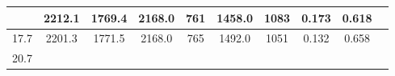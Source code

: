\documentclass[a4paper,12pt]{article}
\begin{document}
\begin{longtable}{
     |
%    
    c|
%    
    c|
%    
    c|
%    
    c|
%    
    c|
%    
    c|
%    
    c|
%    
    c|
%    
    c|
%    
    c|
%    
    }
%        
        & 2212.1
%        

%        

%        
        & 1769.4
%        

%        

%        
        & 2168.0
%        

%        

%        
        & 761
%        

%        

%        
        & 1458.0
%        

%        

%        
        & 1083
%        

%        

%        
        & 0.173
%        

%        

%        
        & 0.618
%        

%        
        \\
        \hline

        

%        

%        
        17.7
%        

%        

%        
        & 2201.3
%        

%        

%        
        & 1771.5
%        

%        

%        
        & 2168.0
%        

%        

%        
        & 765
%        

%        

%        
        & 1492.0
%        

%        

%        
        & 1051
%        

%        

%        
        & 0.132
%        

%        

%        
        & 0.658
%        

%        
        \\
        \hline

        

%        

%        
        20.7
%        

%        


\end{longtable}
\end{document}
